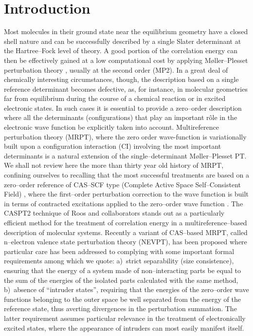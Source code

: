 \documentclass[global,referee]{svjour}
\begin{document}
\section{Introduction\label{sect1}}
Most molecules in their ground state near the equilibrium geometry
have a closed shell nature and can be successfully described by a
single Slater determinant at the Hartree--Fock level of theory. A good
portion of the correlation energy can then be effectively gained at a
low computational cost by applying M\o{}ller--Plesset perturbation
theory \cite{Moller34}, usually at the second order (MP2). In a great deal
of chemically interesting circumstances, though, the description based
on a single reference determinant becomes defective, as, for instance,
in molecular geometries far from equilibrium during the course of a
chemical reaction or in excited electronic states. In such cases it is
essential to provide a zero--order description where all the
determinants (configurations) that play an important r\^ole in the
electronic wave function be explicitly taken into
account. Multireference perturbation theory (MRPT), where the zero
order wave-function is variationally built upon a configuration
interaction (CI) involving the most important determinants is a
natural extension of the single--determinant M\o{}ller--Plesset PT. We
shall not review here the more than thirty year old history of MRPT,
confining ourselves to recalling that the most successful treatments
are based on a zero--order reference of CAS--SCF type (Complete Active
Space Self--Consistent Field) \cite{Ander90,Ander92}, where the
first--order perturbation correction to the wave function is built in
terms of contracted excitations applied to the zero--order
wave function \cite{Werner82}. The CASPT2 technique of Roos and collaborators stands
out as a particularly efficient method for the treatment of
correlation energy in a multireference--based description of molecular
systems. Recently a variant of CAS--based MRPT, called n--electron
valence state perturbation theory (NEVPT), has been
proposed \cite{nev1,nev2,nev3} where particular care has been addressed
to complying with some important formal requirements among which we
quote: a)~strict separability (size consistence), ensuring that the
energy of a system made of non--interacting parts be equal to the sum
of the energies of the isolated parts calculated with the same method,
b)~absence of ``intruder states'', requiring that the energies of the
zero--order wave functions belonging to the outer space be well
separated from the energy of the reference state, thus averting
divergences in the perturbation summation. The latter requirement 
assumes particular relevance in the treatment of electronically
excited states, where the appearance of intruders can most easily
manifest itself. 
\end{document}
